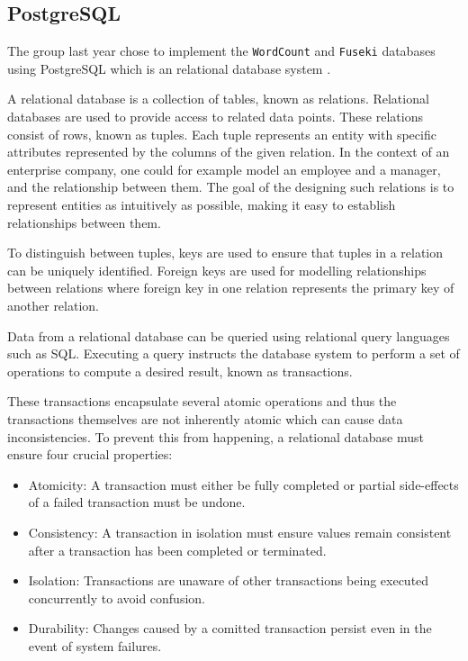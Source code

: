 \subsection{PostgreSQL}
The group last year chose to implement the \texttt{WordCount} and \texttt{Fuseki} databases using PostgreSQL which is an relational database system \cite{knox2020}.

A relational database is a collection of tables, known as relations. Relational databases are used to provide access to related data points.
These relations consist of rows, known as tuples. Each tuple represents an entity with specific attributes represented by the columns of the given relation.
In the context of an enterprise company, one could for example model an employee and a manager, and the relationship between them.
The goal of the designing such relations is to represent entities as intuitively as possible, making it easy to establish relationships between them. 

To distinguish between tuples, keys are used to ensure that tuples in a relation can be uniquely identified.
Foreign keys are used for modelling relationships between relations where foreign key in one relation represents the primary key of another relation.

Data from a relational database can be queried using relational query languages such as SQL.
Executing a query instructs the database system to perform a set of operations to compute a desired result, known as transactions.

These transactions encapsulate several atomic operations and thus the transactions themselves are not inherently atomic which can cause data inconsistencies. 
To prevent this from happening, a relational database must ensure four crucial properties:
\begin{itemize}
    \item Atomicity: A transaction must either be fully completed or partial side-effects of a failed transaction must be undone.
    \item Consistency: A transaction in isolation must ensure values remain consistent after a transaction has been completed or terminated.
    \item Isolation: Transactions are unaware of other transactions being executed concurrently to avoid confusion.
    \item Durability: Changes caused by a comitted transaction persist even in the event of system failures.
\end{itemize}

